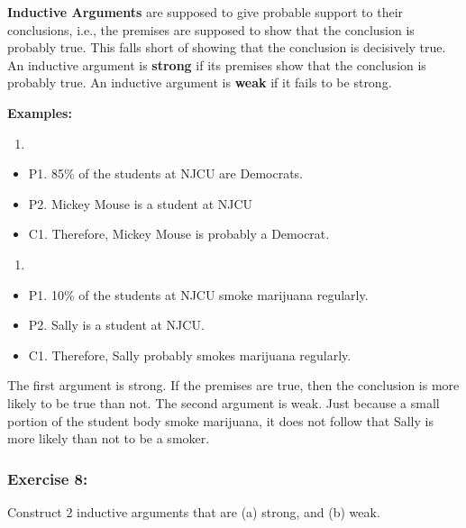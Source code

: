 \documentclass[]{article}
\providecommand{\tightlist}{%
  \setlength{\itemsep}{0pt}\setlength{\parskip}{0pt}}
\begin{document}
\textbf{Inductive Arguments} are supposed to give probable support to
their conclusions, i.e., the premises are supposed to show that the
conclusion is probably true. This falls short of showing that the
conclusion is decisively true. An inductive argument is \textbf{strong}
if its premises show that the conclusion is probably true. An inductive
argument is \textbf{weak} if it fails to be strong.

\textbf{Examples:}

\begin{enumerate}
\def\labelenumi{\arabic{enumi})}
\item
\end{enumerate}

\begin{itemize}
\tightlist
\item
  P1. 85\% of the students at NJCU are Democrats.
\item
  P2. Mickey Mouse is a student at NJCU
\item
  C1. Therefore, Mickey Mouse is probably a Democrat.
\end{itemize}

\begin{enumerate}
\def\labelenumi{\arabic{enumi})}
\setcounter{enumi}{1}
\item
\end{enumerate}

\begin{itemize}
\tightlist
\item
  P1. 10\% of the students at NJCU smoke marijuana regularly.
\item
  P2. Sally is a student at NJCU.
\item
  C1. Therefore, Sally probably smokes marijuana regularly.
\end{itemize}

The first argument is strong. If the premises are true, then the
conclusion is more likely to be true than not. The second argument is
weak. Just because a small portion of the student body smoke marijuana,
it does not follow that Sally is more likely than not to be a smoker.

\subsubsection{Exercise 8:}\label{exercise-8}

Construct 2 inductive arguments that are (a) strong, and (b) weak.
\end{document}

